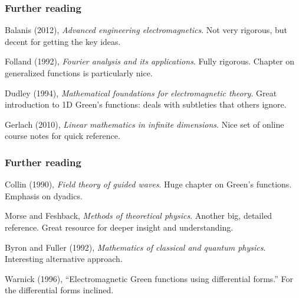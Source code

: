 \documentclass[12 pt, compress, handout, intlimits]{beamer}
\begin{document}
\note{}

\begin{frame}[fragile]
    \frametitle{Further reading}
    Balanis (2012), \emph{Advanced engineering electromagnetics}. 
    Not very rigorous, but decent for getting the key ideas.

    Folland (1992), \emph{Fourier analysis and its applications}. 
    Fully rigorous. 
    Chapter on generalized functions is particularly nice.

    Dudley (1994), \emph{Mathematical foundations for electromagnetic theory}.
    Great introduction to 1D Green's functions: deals with subtleties that others ignore.

    Gerlach (2010), \emph{Linear mathematics in infinite dimensions}.
    Nice set of online course notes for quick reference.
    
\end{frame}

\note{}

\begin{frame}[fragile]
    \frametitle{Further reading}
    Collin (1990), \emph{Field theory of guided waves}. 
    Huge chapter on Green's functions. 
    Emphasis on dyadics.

    Morse and Feshback, \emph{Methods of theoretical physics}.
    Another big, detailed reference. 
    Great resource for deeper insight and understanding.

    Byron and Fuller (1992), \emph{Mathematics of classical and quantum physics}.
    Interesting alternative approach.

    Warnick (1996), ``Electromagnetic Green functions using differential forms.''
    For the differential forms inclined.

\end{frame}    

\note{}
\end{document}
